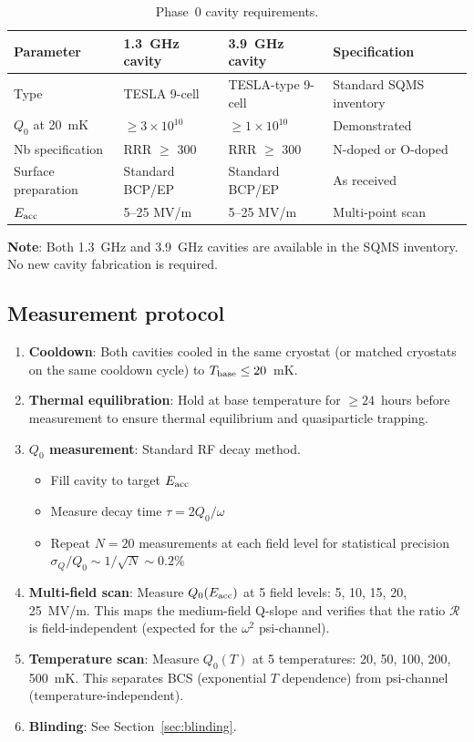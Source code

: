 \documentclass[11pt]{article}
\newcommand{\ee}[1]{\times 10^{#1}}
\theoremstyle{definition}
\theoremstyle{remark}
\begin{document}
\begin{table}[H]
\centering
\caption{Phase~0 cavity requirements.}
\begin{tabular}{@{}llll@{}}
\toprule
\textbf{Parameter} & \textbf{1.3~GHz cavity} & \textbf{3.9~GHz cavity}
& \textbf{Specification} \\
\midrule
Type & TESLA 9-cell & TESLA-type 9-cell & Standard SQMS inventory \\
$Q_0$ at 20~mK & $\geq 3\ee{10}$ & $\geq 1\ee{10}$ & Demonstrated \\
Nb specification & RRR $\geq$ 300 & RRR $\geq$ 300 & N-doped or O-doped \\
Surface preparation & Standard BCP/EP & Standard BCP/EP & As received \\
$E_{\rm acc}$ & 5--25 MV/m & 5--25 MV/m & Multi-point scan \\
\bottomrule
\end{tabular}
\end{table}

\textbf{Note}: Both 1.3~GHz and 3.9~GHz cavities are available in the
SQMS inventory. No new cavity fabrication is required.

\subsection{Measurement protocol}

\begin{enumerate}
\item \textbf{Cooldown}: Both cavities cooled in the same cryostat
  (or matched cryostats on the same cooldown cycle) to $T_{\rm base}
  \leq 20$~mK.

\item \textbf{Thermal equilibration}: Hold at base temperature for
  $\geq 24$~hours before measurement to ensure thermal equilibrium
  and quasiparticle trapping.

\item \textbf{$Q_0$ measurement}: Standard RF decay method.
  \begin{itemize}[nosep]
  \item Fill cavity to target $E_{\rm acc}$
  \item Measure decay time $\tau = 2Q_0/\omega$
  \item Repeat $N = 20$ measurements at each field level for
    statistical precision $\sigma_Q/Q_0 \sim 1/\sqrt{N} \sim 0.2\%$
  \end{itemize}

\item \textbf{Multi-field scan}: Measure $Q_0(E_{\rm acc})$ at
  5 field levels: 5, 10, 15, 20, 25~MV/m. This maps the medium-field
  Q-slope and verifies that the ratio $\mathcal{R}$ is field-independent
  (expected for the $\omega^2$ psi-channel).

\item \textbf{Temperature scan}: Measure $Q_0(T)$ at 5 temperatures:
  20, 50, 100, 200, 500~mK. This separates BCS (exponential $T$
  dependence) from psi-channel (temperature-independent).

\item \textbf{Blinding}: See Section~\ref{sec:blinding}.
\end{enumerate}
\end{document}
